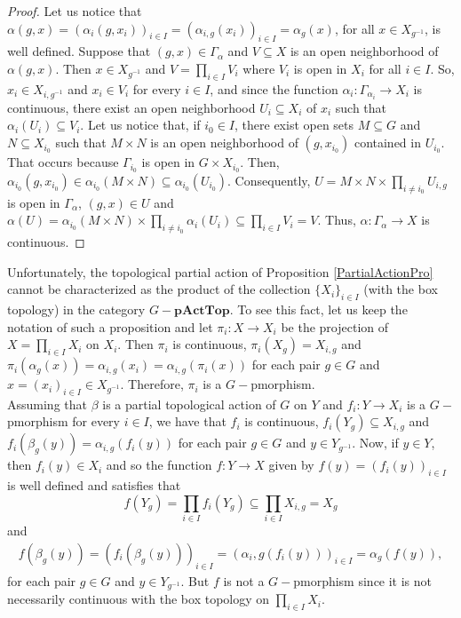 \documentclass[sn-mathphys-num]{sn-jnl}%
\theoremstyle{thmstyleone}%
\theoremstyle{thmstyletwo}%
\theoremstyle{thmstylethree}%
\begin{document}
\begin{proof}
Let us notice that $ \alpha (g, x)  = (\alpha_i (g, x_i))_{i\in I} = (\alpha_ {i, g}(x_i))_{i \in I}= \alpha_{g} (x)$, for all $x\in X_{g^{-1}}$, is well defined. Suppose that $ (g, x) \in \Gamma_ \alpha $ and $V\subseteq X$ is an open neighborhood of $\alpha(g,x)$. Then  $ x \in X_{g^{- 1}} $ and $ V= \prod_{i \in I} V_{i}$ where $V_i$ is open in $X_i$ for all $i\in I$. So, $ x_i\in X_{i, g^{- 1 }} $ and $ x_i \in V_i $ for every  $ i \in I $, and since  the function $ \alpha_i: \Gamma _ {\alpha_i} \to X_i $  is continuous, there exist an open neighborhood $U_i\subseteq X_i$ of $x_i$ such that $\alpha_i(U_i)\subseteq V_i$. Let us notice that, if $i_0\in I$, there exist open sets $M\subseteq G$ and $N\subseteq X_{i_0}$ such that $M\times N$ is an open neighborhood of $(g,x_{i_0})$ contained in $U_{i_0}$.  That occurs because $\Gamma_{i_0}$ is open in $G\times X_{i_0}$.  Then, $\alpha_{i_0}(g,x_{i_0})\in \alpha_{i_0}(M\times N)\subseteq \alpha_{i_0}(U_{i_0})$. Consequently, 
$U=M\times N \times \prod_{i \neq i_0} U_{i, g}$ is open in $\Gamma_\alpha$, $(g,x)\in U$ and $\alpha (U)=\alpha_{i_0}(M\times N) \times \prod_{i \neq i_0} \alpha_i(U_{i})\subseteq \prod_{i \in I} V_{i}=V.$
Thus, $ \alpha: \Gamma _ {\alpha} \to X $ is continuous.
\end{proof}

Unfortunately, the topological partial action of  Proposition \ref{PartialActionPro} cannot be characterized as the product of the collection $ \{X_i \}_{i \in I} $ (with the box topology) in the category $G-\mathbf{pActTop}$. 
To see this fact,  let us keep the notation of such a proposition and let $ \pi_i: X \to X_i $ be the projection of $ X = \prod_{i \in I}X_i$ on $ X_i $. Then $\pi_i$ is continuous, $\pi_i(X_g)=X_{i,g}$ and $ \pi_i (\alpha_g (x)) = \alpha_{i,g}(x_i) = \alpha_{i,g}(\pi_i (x)) $ for each pair $ g \in G $ and $ x = (x_i)_{i \in I} \in X_{g^{-1}}$. Therefore, $ \pi_i $ is a $G-$pmorphism.\\


Assuming that $ \beta $ is a partial topological action of $G$ on $Y$ and $ f_i: Y \to X_i $ is a $G-$pmorphism for every $ i \in I$, we have that $ f_i $ is continuous, $f_i(Y_g)\subseteq X_{i,g}$ and $ f_i (\beta_g(y)) = \alpha_{i,g}(f_i (y)) $ for each pair $ g \in G $ and $y \in Y_{g^{-1}} $. Now, if $ y \in Y $, then $ f_i (y) \in X_i $ and so the function $ f: Y \to X $ given by $ f (y) = (f_i (y))_{i \in I} $ is well defined and satisfies that
$$f(Y_g)=\prod_{i\in I}f_i(Y_g)\subseteq \prod_{i\in I}X_{i,g}=X_g$$
and
\begin{align*}
f (\beta_g(y)) = (f_i (\beta_g(y)))_{i \in I} = (\alpha_i,g(f_i (y)))_{i \in I}
= \alpha_g(f (y)),
\end{align*}
for each pair $ g \in G $ and $ y \in Y_{g^{-1}} $. But $ f $ is not a $G-$pmorphism since it  is not necessarily continuous with the box topology on $ \prod_{i \in I}X_i$.\\
\end{document}
